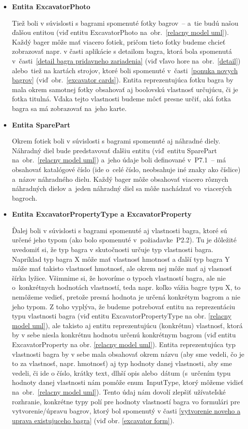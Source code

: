 \begin{itemize}
\item \textbf{Entita ExcavatorPhoto}

Tiež boli v súvislosti s bagrami spomenuté fotky bagrov~-- a~tie budú našou ďalšou entitou (viď entitu ExcavatorPhoto na~obr.~\ref{relacny model uml}). Každý bager môže mať viacero fotiek, pričom tieto fotky budeme chcieť zobrazovať napr. v časti aplikácie s detailom bagra, ktorá bola spomenutá v~časti~\ref{detail bagra pridavneho zariadenia} (viď vľavo hore na~obr.~\ref{detail}) alebo~tiež na kartách strojov, ktoré boli spomenuté v~časti~\ref{ponuka novych bagrov} (viď~obr.~\ref{excavator cards}). Entita reprezentujúca fotku bagra by mala okrem samotnej fotky obsahovať aj boolovskú vlastnosť určujúcu, či je fotka titulná. Vďaka tejto vlastnosti budeme môcť presne určiť, aká fotka bagra sa má zobrazovať na~jeho karte.

\item \textbf{Entita SparePart}

Okrem fotiek boli v súvislosti s bagrami spomenuté aj náhradné diely. Náhradný diel bude predstavovať ďalšiu entitu (viď~entitu SparePart na~obr.~\ref{relacny model uml}) a~jeho údaje boli definované v~P7.1~-- má obsahovať katalógové číslo (ide o~celé číslo, neobsahuje iné znaky ako číslice) a~názov náhradného dielu. Každý bager môže obsahovať viacero rôznych náhradných dielov a~jeden náhradný diel sa môže nachádzať vo~viacerých bagroch.

\item \textbf{Entita ExcavatorPropertyType a ExcavatorProperty}

Ďalej boli v súvislosti s bagrami spomenuté aj vlastnosti bagra, ktoré sú určené jeho typom (ako bolo spomenuté v~požiadavke~P2.2). Tu je dôležité uvedomiť si, že typ bagra v skutočnosti určuje typ vlastnosti bagra. Napríklad typ bagra X môže mať vlastnosť hmotnosť a ďalší typ bagra Y môže mať takisto vlastnosť hmotnosť, ale okrem nej môže mať aj vlasnosť šírka lyžice. Všimnime si, že hovoríme o typoch vlastností bagra, ale nie o~konkrétnych hodnotách vlastností, teda napr. koľko vážia bagre typu X, to nemôžeme vedieť, pretože presná hodnota je určená konkrétym bagrom a nie jeho typom. Z toho vyplýva, že budeme potrebovať entitu na reprezentáciu typu vlastnosti bagra (viď entitu ExcavatorPropertyType na obr. \ref{relacny model uml}), ale takisto aj entitu reprezentujúcu (konkrétnu) vlastnosť, ktorá by v sebe niesla konkrétnu hodnotu určenú konkrétnym bagrom (viď entitu ExcavatorProperty na obr. \ref{relacny model uml}). Entita reprezentujúca typ vlastnosti bagra by v sebe mala obsahovať okrem názvu (aby sme vedeli, čo je to za vlastnosť, napr. hmotnosť) aj typ hodnoty danej vlastnosti, aby sme vedeli, či ide o číslo, krátky text, dlhší opis alebo~dátum (s~určením typu hodnoty danej vlastnosti nám pomôže enum~InputType, ktorý môžeme vidieť na~obr.~\ref{relacny model uml}). Tento údaj nám dovolí zlepšiť užívateľské rozhranie, konkrétne typy polí pre hodnoty vlastností bagra vo formulári pre vytvorenie/úpravu bagrov, ktorý bol spomenutý v časti \ref{vytvorenie noveho a uprava existujuceho bagra} (viď obr. \ref{excavator form}).


\end{itemize}
